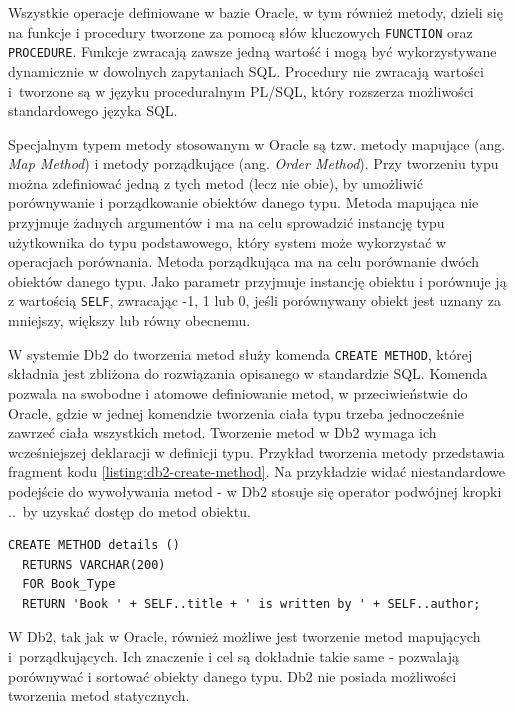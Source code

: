 \documentclass[a4paper,twoside,12pt]{book}
\begin{document}
Wszystkie operacje definiowane w bazie Oracle, w tym również metody, dzieli się na funkcje i procedury tworzone za pomocą słów kluczowych \lstinline{FUNCTION} oraz \lstinline{PROCEDURE}. Funkcje zwracają zawsze jedną wartość i mogą być wykorzystywane dynamicznie w dowolnych zapytaniach SQL. Procedury nie zwracają wartości i~tworzone są w języku proceduralnym PL/SQL, który rozszerza możliwości standardowego języka SQL.

Specjalnym typem metody stosowanym w Oracle są tzw. metody mapujące (ang. \textit{Map Method}) i metody porządkujące (ang. \textit{Order Method}). Przy tworzeniu typu można zdefiniować jedną z tych metod (lecz nie obie), by umożliwić porównywanie i porządkowanie obiektów danego typu. Metoda mapująca nie przyjmuje żadnych argumentów i ma na celu sprowadzić instancję typu użytkownika do typu podstawowego, który system może wykorzystać w operacjach porównania. Metoda porządkująca ma na celu porównanie dwóch obiektów danego typu. Jako parametr przyjmuje instancję obiektu i porównuje ją z wartością \lstinline{SELF}, zwracając -1, 1 lub 0, jeśli porównywany obiekt jest uznany za mniejszy, większy lub równy obecnemu.

W systemie Db2 do tworzenia metod służy komenda \lstinline{CREATE METHOD}, której składnia jest zbliżona do rozwiązania opisanego w standardzie SQL. Komenda pozwala na swobodne i atomowe definiowanie metod, w przeciwieństwie do Oracle, gdzie w jednej komendzie tworzenia ciała typu trzeba jednocześnie zawrzeć ciała wszystkich metod. Tworzenie metod w Db2 wymaga ich wcześniejszej deklaracji w definicji typu. Przykład tworzenia metody przedstawia fragment kodu \ref{listing:db2-create-method}. Na przykładzie widać niestandardowe podejście do wywoływania metod - w Db2 stosuje się operator podwójnej kropki \textquotedbl..\textquotedbl ~by uzyskać dostęp do metod obiektu.

\begin{lstlisting}[style=SQL, caption={Tworzenie metody w IBM Db2.}, label={listing:db2-create-method}, captionpos=b]
CREATE METHOD details ()
  RETURNS VARCHAR(200)
  FOR Book_Type
  RETURN 'Book ' + SELF..title + ' is written by ' + SELF..author;
\end{lstlisting}

W Db2, tak jak w Oracle, również możliwe jest tworzenie metod mapujących i~porządkujących. Ich znaczenie i cel są dokładnie takie same  - pozwalają porównywać i sortować obiekty danego typu. Db2 nie posiada możliwości tworzenia metod statycznych.
\end{document}
